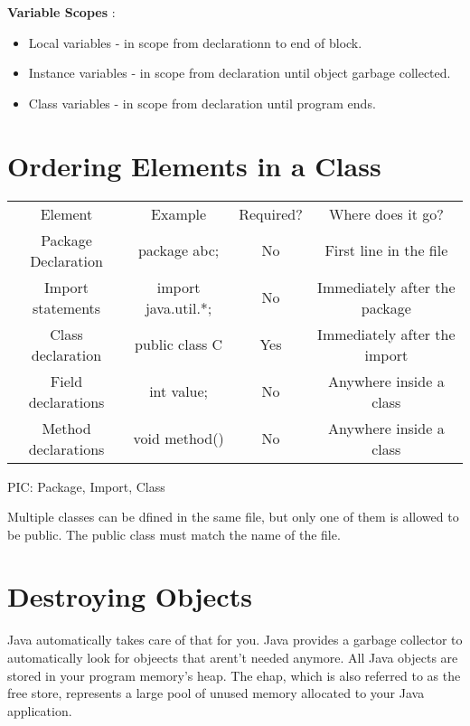 \documentclass{article}
\begin{document}
\textbf{Variable Scopes} :
\begin{itemize}
	\item Local variables - in scope from declarationn to end of block.
	\item Instance variables - in scope from declaration until object garbage collected.
	\item Class variables - in scope from declaration until program ends.
\end{itemize}


\section{Ordering Elements in a Class}
\begin{tabular}{|c|c|c|c|}
	\cline{1-4}
	Element & Example & Required? & Where does it go? \\
	\cline{1-4}
	Package Declaration & package abc; & No & First line in the file \\
	Import statements & import java.util.*; & No & Immediately after the package \\
	Class declaration & public class C & Yes & Immediately after the import \\
	Field declarations & int value; & No & Anywhere inside a class \\
	Method declarations & void method() & No & Anywhere inside a class \\
	\cline{1-4}
\end{tabular}

PIC: Package, Import, Class

Multiple classes can be dfined in the same file, but only one of them is allowed to be public. The public class must match the name of the file.

\section{Destroying Objects}
Java automatically takes care of that for you. Java provides a garbage collector to automatically look for objeects that arent't needed anymore.
All Java objects are stored in your program memory's heap. The ehap, which is also referred to as the free store, represents a large pool of unused memory allocated to your Java application.
\end{document}
